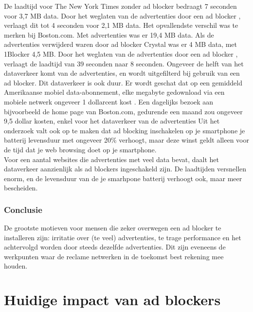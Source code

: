 \documentclass[pdftex,a4paper,12pt,twoside]{report}
\begin{document}
De laadtijd voor The New York Times zonder ad blocker bedraagt 7 seconden voor 3,7 MB data. Door het weglaten van de advertenties door een ad blocker , verlaagt dit tot 4 seconden voor 2,1 MB data. Het opvallendste verschil was te merken bij Boston.com. Met advertenties was er 19,4 MB data. Als de advertenties verwijderd waren door ad blocker Crystal was er 4 MB data, met 1Blocker 4,5 MB. Door het weglaten van de advertenties door een ad blocker , verlaagt de laadtijd van 39 seconden naar 8 seconden.
Ongeveer de helft van het dataverkeer komt van de advertenties, en wordt uitgefilterd bij gebruik van een ad blocker. Dit dataverkeer is ook duur. Er wordt geschat dat op een gemiddeld Amerikaanse mobiel data-abonnement, elke megabyte gedownload via een mobiele netwerk ongeveer 1 dollarcent kost . Een dagelijks bezoek aan bijvoorbeeld de home page van Boston.com, gedurende een maand zou ongeveer 9,5 dollar kosten, enkel voor het dataverkeer van de advertenties 
Uit het onderzoek valt ook op te maken dat ad blocking inschakelen op je smartphone je batterij levensduur met ongeveer 20\% verhoogt, maar deze winst geldt alleen voor de tijd dat je web browsing doet op je smartphone.
\\
Voor een aantal websites die advertenties met veel data bevat, daalt het dataverkeer aanzienlijk als ad blockers ingeschakeld zijn. De laadtijden versnellen enorm, en de levensduur van de je smarhpone batterij verhoogt ook, maar meer bescheiden.

\subsection{Conclusie}
\label{sec Conclusie}
De grootste motieven voor mensen die zeker overwegen een ad blocker te installeren zijn: irritatie over (te veel) advertenties, te trage performance en het achtervolgd worden door steeds dezelfde advertenties. Dit zijn eveneens de werkpunten waar de reclame netwerken in de toekomst best rekening mee houden. 

\chapter{Huidige impact van ad blockers}
\label{ch: Huidige impact van ad blockers}
\end{document}
